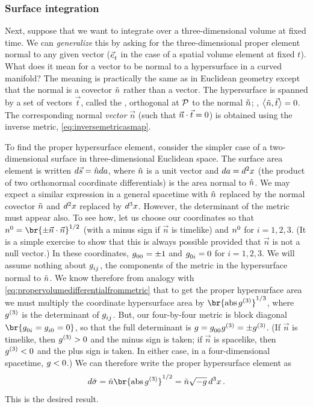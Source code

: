 \subsubsection{Surface integration}
%
Next, suppose that we want to integrate over a three-dimensional volume at fixed time. We can \emph{generalize} this by asking for the three-dimensional proper  element normal to any given vector ($\tbvec t$ in the case of a spatial volume element at fixed $t$). What does it mean for a vector to be normal to a hypersurface in a curved manifold? The meaning is practically the same as in Euclidean geometry except that the normal is a covector $\tilde{n}$ rather than a vector. The hypersurface is spanned by a set of vectors $\vec t$, called the , orthogonal at $\mathcal{P}$ to the normal $\tilde{n}$; \ie, $\sprod{\cov n}{\vec t} = 0$. The corresponding normal \emph{vector} $\vec n$ (such that $\vec n\cdot\vec t = 0$) is obtained using the inverse metric, \cref{eq:inversemetricasmap}.

 To find the proper hypersurface element, consider the simpler case of a two-dimensional surface in three-dimensional Euclidean space. The surface area element is written $d\vec s = \hat{n} da$, where $\hat{n}$ is a unit vector and $da = d^{2}x$ (the product of two orthonormal coordinate differentials) is the area normal to $\hat{n}$. We may expect a similar expression in a general spacetime with $\hat{n}$ replaced by the normal covector $\tilde{n}$ and $d^{2}x$ replaced by $d^{3}x$. However, the determinant of the metric must appear also. To see how, let us choose our coordinates so that $\tvec n0 = \br{\pm\vec n\iprod\vec n}^{1/2}$ (with a minus sign if $\vec n$ is timelike) and $\tvec n0$ for $i = 1,2,3$. (It is a simple exercise to show that this is always possible provided that $\vec n$ is not a null vector.) In these coordinates, $\tmetric 00 = \pm 1$ and $\tmetric 0i = 0$ for $i = 1,2,3$. We will assume nothing about $\tmetric ij$, the components of the metric in the hypersurface normal to $\tilde{n}$. We know therefore from analogy with \cref{eq:propervolumedifferentialfrommetric} that to get the proper hypersurface area we must multiply the coordinate hypersurface area by $\br{\abs\metric^{(3)}}^{1/3}$, where $g^{(3)}$ is the determinant of $\tmetric ij$. But, our four-by-four metric is block diagonal $\br{\tmetric 0i = \tmetric i0 = 0}$, so that the full determinant is $\metric = \tmetric 00\metric^{(3)} = \pm\metric^{(3)}$. (If $\vec n$ is timelike, then $g^{(3)} > 0$ and the minus sign is taken; if $\vec n$ is spacelike, then $g^{(3)} < 0$ and the plus sign is taken. In either case, in a four-dimensional spacetime, $g < 0$.) We can therefore write the proper hypersurface element as
%
\begin{equation}\label{eq:properhypersurfaceelement}
  d\cov\area = \cov n\br{\abs\metric^{(3)}}^{1/2}
             = \cov n\sqrt{-\metric}\,\tvolel 3\,.
\end{equation}
%
This is the desired result.


